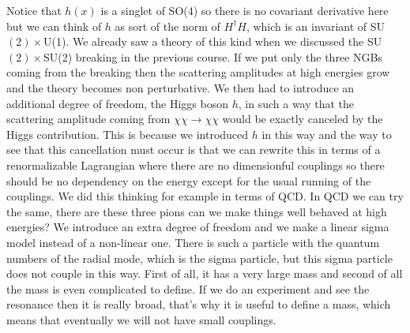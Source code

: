 \documentclass[../main.tex]{subfiles}
\begin{document}
Notice that $h(x)$ is a singlet of SO(4) so there is no covariant derivative here but we can think of $h$ as sort of the norm of $H^\dagger H$, which is an invariant of SU$(2)\times$U(1). We already saw a theory of this kind when we discussed the SU$(2)\times$SU(2) breaking in the previous course. If we put only the three NGBs coming from the breaking then the scattering amplitudes at high energies grow and the theory becomes non perturbative. We then had to introduce an additional degree of freedom, the Higgs boson $h$, in such a way that the scattering amplitude coming from $\chi\chi\to\chi\chi$ would be exactly canceled by the Higgs contribution. This is because we introduced $h$ in this way and the way to see that this cancellation must occur is that we can rewrite this in terms of a renormalizable Lagrangian where there are no dimensionful couplings so there should be no dependency on the energy except for the usual running of the couplings. We did this thinking for example in terms of QCD. In QCD we can try the same, there are these three pions can we make things well behaved at high energies? We introduce an extra degree of freedom and we make a linear sigma model instead of a non-linear one. There is such a particle with the quantum numbers of the radial mode, which is the sigma particle, but this sigma particle does not couple in this way. First of all, it has a very large mass and second of all the mass is even complicated to define. If we do an experiment and see the resonance then it is really broad, that's why it is useful to define a mass, which means that eventually we will not have small couplings.\\
\end{document}
